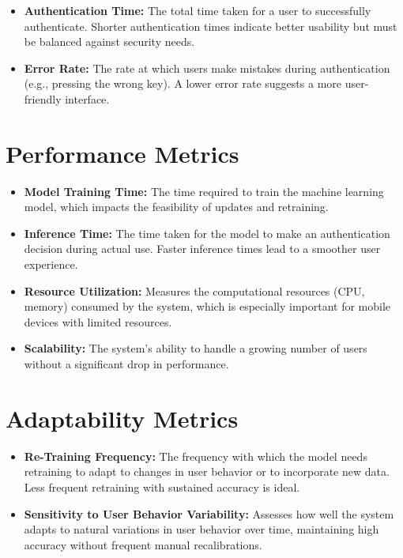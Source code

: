 \documentclass{article}
\begin{document}
\begin{itemize}[label=--,leftmargin=*]
    \item \textbf{Authentication Time:} The total time taken for a user to successfully authenticate. Shorter authentication times indicate better usability but must be balanced against security needs.
    \item \textbf{Error Rate:} The rate at which users make mistakes during authentication (e.g., pressing the wrong key). A lower error rate suggests a more user-friendly interface.
\end{itemize}

\section*{Performance Metrics}

\begin{itemize}[label=--,leftmargin=*]
    \item \textbf{Model Training Time:} The time required to train the machine learning model, which impacts the feasibility of updates and retraining.
    \item \textbf{Inference Time:} The time taken for the model to make an authentication decision during actual use. Faster inference times lead to a smoother user experience.
    \item \textbf{Resource Utilization:} Measures the computational resources (CPU, memory) consumed by the system, which is especially important for mobile devices with limited resources.
    \item \textbf{Scalability:} The system's ability to handle a growing number of users without a significant drop in performance.
\end{itemize}

\section*{Adaptability Metrics}

\begin{itemize}[label=--,leftmargin=*]
    \item \textbf{Re-Training Frequency:} The frequency with which the model needs retraining to adapt to changes in user behavior or to incorporate new data. Less frequent retraining with sustained accuracy is ideal.
    \item \textbf{Sensitivity to User Behavior Variability:} Assesses how well the system adapts to natural variations in user behavior over time, maintaining high accuracy without frequent manual recalibrations.
\end{itemize}
\end{document}
